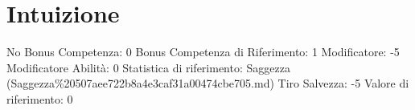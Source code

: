 \section{Intuizione}\label{intuizione}

\begin{description}
\tightlist
\item[Tags: ABI]
No Bonus Competenza: 0 Bonus Competenza di Riferimento: 1 Modificatore:
-5 Modificatore Abilità: 0 Statistica di riferimento: Saggezza
(Saggezza\%20507aee722b8a4e3caf31a00474cbe705.md) Tiro Salvezza: -5
Valore di riferimento: 0
\end{description}

